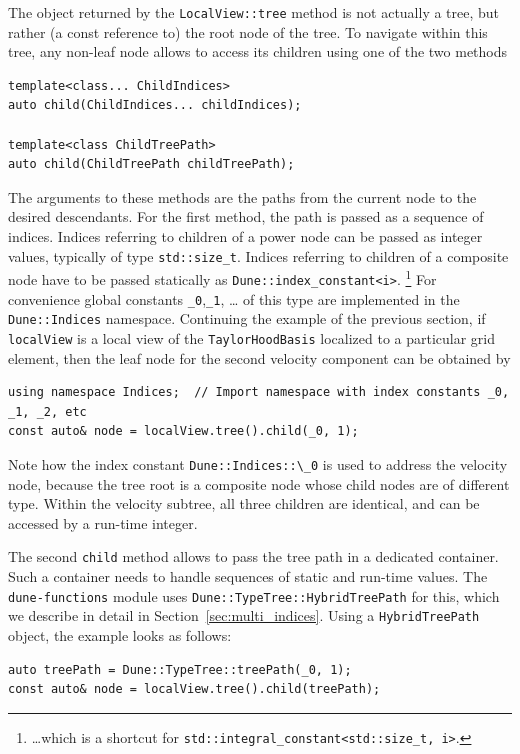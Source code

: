 \documentclass[a4paper,10pt,headings=normal,bibliography=totoc]{scrartcl}
\newcommand{\cpp}[1]{\lstinline[basicstyle=\ttfamily]!#1!}
\newcommand{\dunemodule}[1]{\texttt{#1}}
\newcommand{\todosander}[1]{\todo[inline,color=orange,author=OS]{#1}}
\begin{document}
The object returned by the \cpp{LocalView::tree} method is not actually a tree,
but rather (a const reference to) the root node of the tree.  To navigate within
this tree, any non-leaf node allows to access
its children using one of the two methods
\todosander{Für Leafs muss das noch implementiert werden!}
\begin{lstlisting}[style=Interface]
template<class... ChildIndices>
auto child(ChildIndices... childIndices);

template<class ChildTreePath>
auto child(ChildTreePath childTreePath);
\end{lstlisting}
The arguments to these methods are the paths from the current node to the desired
descendants.  For the first method, the path is passed
as a sequence of indices. Indices referring
to children of a power node can be passed as integer values, typically of type \cpp{std::size_t}.
Indices referring to children of a composite node
have to be passed statically as \cpp{Dune::index_constant<i>}.%
%
\footnote{
\dots which is a shortcut for \cpp{std::integral_constant<std::size_t, i>}.
}
%
For convenience global constants \cpp{_0},\cpp{_1}, \dots
of this type are implemented in the \cpp{Dune::Indices}
namespace.
Continuing the example of the previous section, if \cpp{localView} is a
local view of the \cpp{TaylorHoodBasis} localized to a particular grid element,
then the leaf node for the second velocity
component can be obtained by
%
\begin{lstlisting}[style=Example]
using namespace Indices;  // Import namespace with index constants _0, _1, _2, etc
const auto& node = localView.tree().child(_0, 1);
\end{lstlisting}
%
Note how the index constant \cpp{Dune::Indices::\_0} is used
to address the velocity node, because the
tree root is a composite node whose child nodes are of different type.
Within the velocity subtree, all three children are identical, and can be
accessed by a run-time integer.

The second \cpp{child} method allows to pass the tree path in a dedicated container.
Such a container needs to handle sequences of static and run-time values.
The \dunemodule{dune-functions} module uses \cpp{Dune::TypeTree::HybridTreePath}
for this, which we describe in detail in Section~\ref{sec:multi_indices}.
Using a \cpp{HybridTreePath} object, the example looks as follows:
%
\begin{lstlisting}[style=Example]
auto treePath = Dune::TypeTree::treePath(_0, 1);
const auto& node = localView.tree().child(treePath);
\end{lstlisting}
\end{document}
